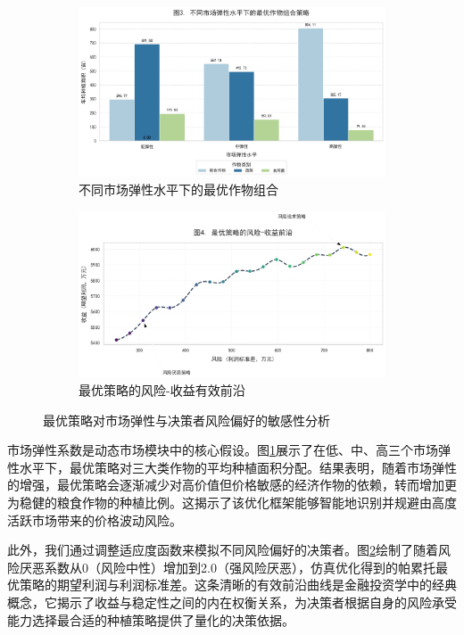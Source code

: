\documentclass[withoutpreface,bwprint]{cumcmthesis} %
\begin{document}
\begin{figure}[htbp]
	\centering
	\begin{subfigure}{0.48\textwidth}
		\includegraphics[width=\linewidth]{figures/3_1.png}
		\caption{不同市场弹性水平下的最优作物组合}
		\label{fig:3_1}
	\end{subfigure}
	\hfill
	\begin{subfigure}{0.48\textwidth}
		\includegraphics[width=\linewidth]{figures/3_2.png}
		\caption{最优策略的风险-收益有效前沿}
		\label{fig:3_2}
	\end{subfigure}
	\caption{最优策略对市场弹性与决策者风险偏好的敏感性分析}
	\label{fig:sensitivity_3}
\end{figure}

市场弹性系数是动态市场模块中的核心假设。图\ref{fig:3_1}展示了在低、中、高三个市场弹性水平下，最优策略对三大类作物的平均种植面积分配。结果表明，随着市场弹性的增强，最优策略会逐渐减少对高价值但价格敏感的经济作物的依赖，转而增加更为稳健的粮食作物的种植比例。这揭示了该优化框架能够智能地识别并规避由高度活跃市场带来的价格波动风险。

此外，我们通过调整适应度函数来模拟不同风险偏好的决策者。图\ref{fig:3_2}绘制了随着风险厌恶系数从0（风险中性）增加到2.0（强风险厌恶），仿真优化得到的帕累托最优策略的期望利润与利润标准差。这条清晰的有效前沿曲线是金融投资学中的经典概念，它揭示了收益与稳定性之间的内在权衡关系，为决策者根据自身的风险承受能力选择最合适的种植策略提供了量化的决策依据。
\end{document}
